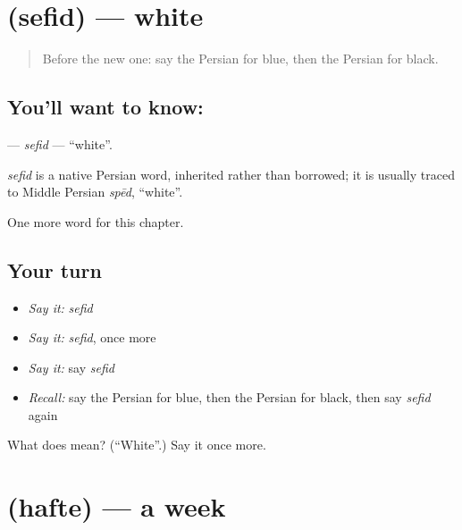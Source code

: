 \section[\texorpdfstring{\fa{سفید} (sefid)}{سفید (sefid)}]{ (sefid) — white}

\label{lesson:FA-C64-sefid}



\begin{quote}
Before the new one: say the Persian for blue, then the Persian for black.
\end{quote}

\subsection*{You'll want to know: }
\textbf{} — \emph{sefid} — \textquotedblleft{}white\textquotedblright{}.

\begin{cousinweb}
\emph{sefid} is a native Persian word, inherited rather than borrowed; it is usually traced to Middle Persian \emph{spēd}, \textquotedblleft{}white\textquotedblright{}.
\end{cousinweb}

\begin{grammarlens}[title={What you've built}]
One more word for this chapter.
\end{grammarlens}

\subsection*{Your turn}
\begin{itemize}
\raggedright
  \item \emph{Say it:} \emph{sefid}
  \item \emph{Say it:} \emph{sefid}, once more
  \item \emph{Say it:} say \emph{sefid}
  \item \emph{Recall:} say the Persian for blue, then the Persian for black, then say \emph{sefid} again
\end{itemize}

\begin{tcolorbox}[breakable,colback=teal!4,colframe=teal!35!black,title={Before you move on}]
What does  mean? (\textquotedblleft{}White\textquotedblright{}.) Say it once more.
\end{tcolorbox}
\section[\texorpdfstring{\fa{هفته} (hafte)}{هفته (hafte)}]{ (hafte) — a week}

